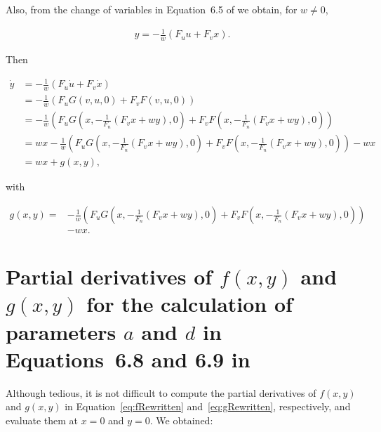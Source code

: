 \documentclass{article}
\theoremstyle{lemma}
\begin{document}
Also, from the change of variables in Equation~6.5 of \citet{izhikevich07}
we obtain, for $w\neq0$,

\begin{align}
y=-\frac{1}{w}(F_uu+F_vx).\nonumber
\end{align}

\noindent Then

\begin{align}
\dot{y}&=-\frac{1}{w}(F_u\dot{u}+F_v\dot{x})\nonumber\\
&=-\frac{1}{w}(F_uG(v,u,0)+F_vF(v,u,0))\nonumber\\
&=-\frac{1}{w}(F_uG(x,-\frac{1}{F_n}(F_vx+wy),0)+F_vF(x,-\frac{1}{F_n}(F_vx+wy),0))\nonumber\\
&=wx-\frac{1}{w}(F_uG(x,-\frac{1}{F_n}(F_vx+wy),0)+F_vF(x,-\frac{1}{F_n}(F_vx+wy),0))-wx\nonumber\\
&=wx+g(x,y),\nonumber
\end{align}

\noindent with

\begin{align}
g(x,y)=&-\frac{1}{w}(F_uG(x,-\frac{1}{F_n}(F_vx+wy),0)+F_vF(x,-\frac{1}{F_n}(F_vx+wy),0))\nonumber\\
&-wx.\label{eq:gRewritten}
\end{align}

\section{Partial derivatives of $f(x,y)$ and $g(x,y)$ for the calculation of
parameters $a$ and $d$ in Equations~6.8 and 6.9 in \citet{izhikevich07}}

Although tedious, it is not difficult to compute the partial derivatives of
$f(x,y)$ and $g(x,y)$ in Equation~\ref{eq:fRewritten} and~\ref{eq:gRewritten},
respectively, and evaluate them at $x=0$ and $y=0$. We obtained:
\end{document}
